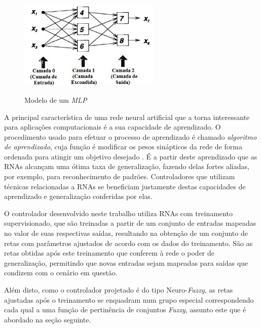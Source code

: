 \begin{figure}[!htb]
    \centering
    \caption{Modelo de um \textit{MLP}}
    \includegraphics[width=0.6\textwidth]{./04-figuras/fund_teorica/rna_traduzido}
    \label{fig:rna}
\end{figure}

A principal característica de uma rede neural artificial que a torna interessante para aplicações computacionais é a sua capacidade de aprendizado. O procedimento usado para efetuar o processo de aprendizado é chamado \textit{algoritmo de aprendizado}, cuja função é modificar os pesos sinápticos da rede de forma ordenada para atingir um objetivo desejado \cite[p.~24]{Haykin1998}. É a partir deste aprendizado que as RNAs alcançam uma ótima taxa de generalização, fazendo delas fortes aliadas, por exemplo, para reconhecimento de padrões. Controladores que utilizam técnicas relacionadas a RNAs se beneficiam justamente destas capacidades de aprendizado e generalização conferidas por elas.

O controlador desenvolvido neste trabalho utiliza RNAs com treinamento supervisionado, que são treinadas a partir de um conjunto de entradas mapeadas no valor de suas respectivas saídas, resultando na obtenção de um conjunto de retas com parâmetros ajustados de acordo com os dados do treinamento. São as retas obtidas após este treinamento que conferem à rede o poder de generalização, permitindo que novas entradas sejam mapeadas para saídas que condizem com o cenário em questão.

Além disto, como o controlador projetado é do tipo Neuro-\textit{Fuzzy}, as retas ajustadas após o treinamento se enquadram num grupo especial correspondendo cada qual a uma função de pertinência de conjuntos \textit{Fuzzy}, assunto este que é abordado na seção seguinte.
